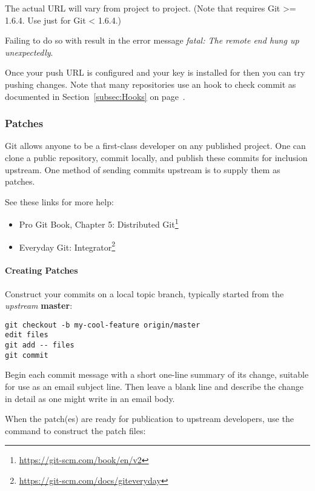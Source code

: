 The actual URL will vary from project to project. (Note that 
requires Git >= 1.6.4. Use just  for Git < 1.6.4.)

Failing to do so with result in the error message \textit{fatal: The
remote end hung up unexpectedly}.

Once your push URL is configured and your key is installed for
 then you can try pushing changes. Note that many
repositories use an  hook to check commit as documented in
Section~\ref{subsec:Hooks} on page~\pageref{subsec:Hooks}.


\subsubsection{Patches}
\label{subsubsec:Patches}

Git allows anyone to be a first-class developer on any published project. One
can clone a public repository, commit locally, and publish these commits for
inclusion upstream. One method of sending commits upstream is to supply them as
patches.

See these links for more help:
\begin{itemize}
\item Pro Git Book, Chapter 5: Distributed Git\footnote{\url{https://git-scm.com/book/en/v2}}
\item Everyday Git: Integrator\footnote{\url{https://git-scm.com/docs/giteveryday}}
\end{itemize}


\paragraph{Creating Patches}
\label{par:CreatingPatches}

Construct your commits on a local topic branch, typically started from the
\textit{upstream} \textbf{master}:

\begin{verbatim}
git checkout -b my-cool-feature origin/master
edit files
git add -- files
git commit
\end{verbatim}

Begin each commit message with a short one-line summary of its change, suitable
for use as an email subject line. Then leave a blank line and describe the
change in detail as one might write in an email body.

When the patch(es) are ready for publication to upstream developers, use the
 command to construct the patch files:

